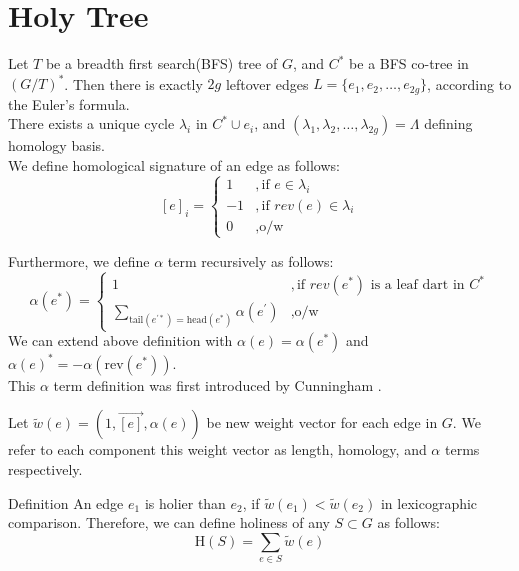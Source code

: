 \documentclass{article}
\begin{document}
\section{Holy Tree}
Let $T$ be a breadth first search(BFS) tree of $G$, and $C^{*}$ be a BFS 
co-tree in $(G/T)^*$. Then there is exactly $2g$ leftover edges 
$L = \{e_1, e_2, \ldots, e_{2g}\}$, according to the Euler's formula. \\

There exists a unique cycle $\lambda_i$ in $C^{*} \cup {e_i}$, and $(\lambda_1, 
\lambda_2, \ldots, \lambda_{2g}) = \Lambda$ defining homology basis. \\
We define homological signature of an edge as follows:
\[ [e]_{i} = \begin{cases} 1 & ,\mbox{if } e \in \lambda_i \\
                          -1 & ,\mbox{if } rev(e) \in \lambda_i \\
                           0 & ,\mbox{o/w} \end{cases}\]

Furthermore, we define $\alpha$  term recursively as follows: \\
\[ \alpha(e^*) = 
  \begin{cases} 1 & ,\mbox{if } rev(e^*) \mbox{ is a leaf dart in } C^{*} \\
                           \sum \limits_{ \text{tail}(e^{'*})
                           = \text{head}(e^*) } \alpha(e^{'}) & ,
                           \mbox{o/w} \end{cases}\]
We can extend above definition with $\alpha(e) = \alpha(e^*)$ and 
  $\alpha(e)^* = - \alpha(\text{rev}(e^*))$. \\

This $\alpha$ term definition was first introduced by Cunningham \cite{cunningham1976network}.

Let $\tilde w(e) = ( 1, \vec{[e]}, \alpha(e) )$ be new
weight vector for each edge in $G$. We refer to each component this weight vector
as length, homology, and $\alpha$ terms respectively. \\

\begin{oneshot}{Definition}
An edge $e_1$ is holier than $e_2$, 
if $\tilde w(e_1) < \tilde w(e_2)$ in lexicographic comparison. 
Therefore, we can define holiness of any $S \subset G $ as follows:
\[\text{H}(S) = \sum \limits_{e \in S} \tilde w(e)\]
\end{oneshot}
\end{document}
